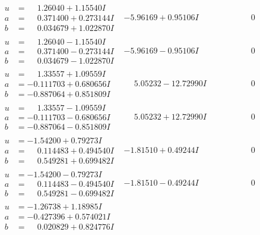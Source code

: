\documentclass[1p]{elsarticle_modified}
\theoremstyle{definition}
\begin{document}
$$\begin{array}{c|c|c}
\begin{aligned}
u &= \phantom{-}1.26040 + 1.15540 I \\
a &= \phantom{-}0.371400 + 0.273144 I \\
b &= \phantom{-}0.034679 + 1.022870 I\end{aligned}
 & -5.96169 + 0.95106 I & \phantom{-0.000000 } 0 \\ \hline\begin{aligned}
u &= \phantom{-}1.26040 - 1.15540 I \\
a &= \phantom{-}0.371400 - 0.273144 I \\
b &= \phantom{-}0.034679 - 1.022870 I\end{aligned}
 & -5.96169 - 0.95106 I & \phantom{-0.000000 } 0 \\ \hline\begin{aligned}
u &= \phantom{-}1.33557 + 1.09559 I \\
a &= -0.111703 + 0.680656 I \\
b &= -0.887064 + 0.851809 I\end{aligned}
 & \phantom{-}5.05232 - 12.72990 I & \phantom{-0.000000 } 0 \\ \hline\begin{aligned}
u &= \phantom{-}1.33557 - 1.09559 I \\
a &= -0.111703 - 0.680656 I \\
b &= -0.887064 - 0.851809 I\end{aligned}
 & \phantom{-}5.05232 + 12.72990 I & \phantom{-0.000000 } 0 \\ \hline\begin{aligned}
u &= -1.54200 + 0.79273 I \\
a &= \phantom{-}0.114483 + 0.494540 I \\
b &= \phantom{-}0.549281 + 0.699482 I\end{aligned}
 & -1.81510 + 0.49244 I & \phantom{-0.000000 } 0 \\ \hline\begin{aligned}
u &= -1.54200 - 0.79273 I \\
a &= \phantom{-}0.114483 - 0.494540 I \\
b &= \phantom{-}0.549281 - 0.699482 I\end{aligned}
 & -1.81510 - 0.49244 I & \phantom{-0.000000 } 0 \\ \hline\begin{aligned}
u &= -1.26738 + 1.18985 I \\
a &= -0.427396 + 0.574021 I \\
b &= \phantom{-}0.020829 + 0.824776 I\end{aligned}

\end{array}$$
\end{document}
